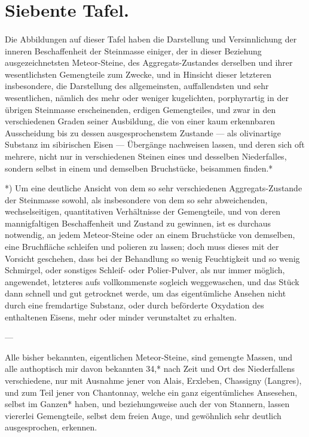 \documentclass[a4paper, 11pt, oneside, german]{article}
\begin{document}
\section{Siebente Tafel.}
\paragraph{}
Die Abbildungen auf dieser Tafel haben die Darstellung und Versinnlichung der inneren Beschaffenheit der Steinmasse einiger, der in dieser Beziehung ausgezeichnetsten Meteor-Steine, des Aggregats-Zustandes derselben und ihrer wesentlichsten Gemengteile zum Zwecke, und in Hinsicht dieser letzteren insbesondere, die Darstellung des allgemeinsten, auffallendsten und sehr wesentlichen, nämlich des mehr oder weniger kugelichten, porphyrartig in der übrigen Steinmasse erscheinenden, erdigen Gemengteiles, und zwar in den verschiedenen Graden seiner Ausbildung, die von einer kaum erkennbaren Ausscheidung bis zu dessen ausgesprochenstem Zustande --- als olivinartige Substanz im sibirischen Eisen --- Übergänge nachweisen lassen, und deren sich oft mehrere, nicht nur in verschiedenen Steinen eines und desselben Niederfalles, sondern selbst in einem und demselben Bruchstücke, beisammen finden.*

*) Um eine deutliche Ansicht von dem so sehr verschiedenen Aggregats-Zustande der Steinmasse sowohl, als insbesondere von dem so sehr abweichenden, wechselseitigen, quantitativen Verhältnisse der Gemengteile, und von deren mannigfaltigen Beschaffenheit und Zustand zu gewinnen, ist es durchaus notwendig, an jedem Meteor-Steine oder an einem Bruchstücke von demselben, eine Bruchfläche schleifen und polieren zu lassen; doch muss dieses mit der Vorsicht geschehen, dass bei der Behandlung so wenig Feuchtigkeit und so wenig Schmirgel, oder sonstiges Schleif- oder Polier-Pulver, als nur immer möglich, angewendet, letzteres aufs vollkommenste sogleich weggewaschen, und das Stück dann schnell und gut getrocknet werde, um das eigentümliche Ansehen nicht durch eine fremdartige Substanz, oder durch beförderte Oxydation des enthaltenen Eisens, mehr oder minder verunstaltet zu erhalten.

---

Alle bisher bekannten, eigentlichen Meteor-Steine, sind gemengte Massen, und alle authoptisch mir davon bekannten 34,* nach Zeit und Ort des Niederfallens verschiedene, nur mit Ausnahme jener von Alais, Erxleben, Chassigny (Langres), und zum Teil jener von Chantonnay, welche ein ganz eigentümliches Ansesehen, selbst im Ganzen* haben, und beziehungsweise auch der von Stannern, lassen viererlei Gemengteile, selbst dem freien Auge, und gewöhnlich sehr deutlich ausgesprochen, erkennen.
\end{document}
